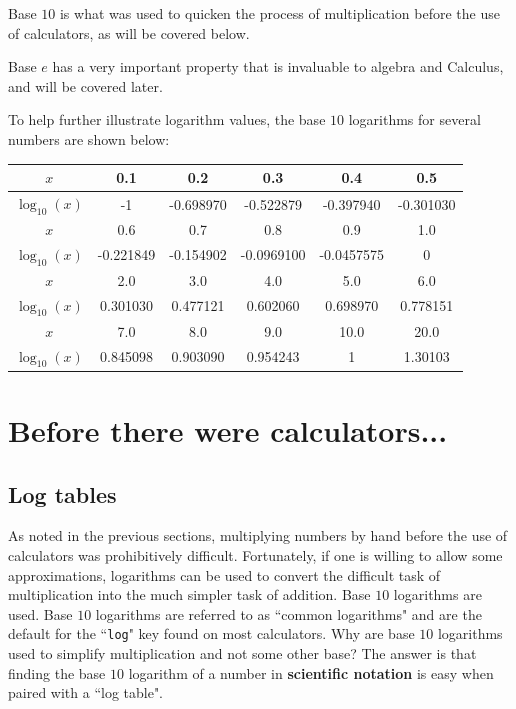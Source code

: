\documentclass{article}
\begin{document}
Base \(10\) is what was used to quicken the process of multiplication before the use of calculators, as will be covered below. 

Base \(e\) has a very important property that is invaluable to algebra and Calculus, and will be covered later.

To help further illustrate logarithm values, the base \(10\) logarithms for several numbers are shown below:

\begin{tabular}{|c||c|c|c|c|c|}
\hline
\(x\) & 0.1 & 0.2 & 0.3 & 0.4 & 0.5 \\
\hline
\(\log_{10}(x)\) & -1 & -0.698970 & -0.522879 & -0.397940 & -0.301030 \\
\hline
\hline
\(x\) & 0.6 & 0.7 & 0.8 & 0.9 & 1.0 \\
\hline
\(\log_{10}(x)\) & -0.221849 & -0.154902 & -0.0969100 & -0.0457575 & 0 \\
\hline
\hline
\(x\) & 2.0 & 3.0 & 4.0 & 5.0 & 6.0 \\
\hline
\(\log_{10}(x)\) & 0.301030 & 0.477121 & 0.602060 & 0.698970 & 0.778151 \\
\hline
\hline
\(x\) & 7.0 & 8.0 & 9.0 & 10.0 & 20.0 \\
\hline
\(\log_{10}(x)\) & 0.845098 & 0.903090 & 0.954243 & 1 & 1.30103 \\
\hline
\end{tabular}




\section*{Before there were calculators...}

\subsection*{Log tables}

As noted in the previous sections, multiplying numbers by hand before the use of calculators was prohibitively difficult. Fortunately, if one is willing to allow some approximations, logarithms can be used to convert the difficult task of multiplication into the much simpler task of addition. Base \(10\) logarithms are used. Base \(10\) logarithms are referred to as ``common logarithms" and are the default for the ``\texttt{log}" key found on most calculators. Why are base \(10\) logarithms used to simplify multiplication and not some other base? The answer is that finding the base \(10\) logarithm of a number in {\bf scientific notation} is easy when paired with a ``log table".
\end{document}
